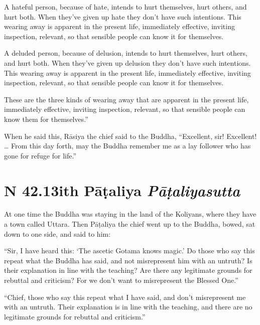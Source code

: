 \documentclass[12pt,openany]{book}%
\newcommand*{\suttatitleacronym}[1]{\smaller[2]{#1}\vspace*{.3em}}
\newcommand*{\suttatitletranslation}[1]{\linebreak{#1}}
\newcommand*{\suttatitleroot}[1]{\linebreak\smaller[2]\itshape{#1}}
\newcommand*{\tocacronym}[1]{\hspace*{-3.3em}{#1}\quad}
\newcommand*{\toctranslation}[1]{#1}
\newcommand*{\tocroot}[1]{(\textit{#1})}
\begin{document}
A hateful person, because of hate, intends to hurt themselves, hurt others, and hurt both. When they’ve given up hate they don’t have such intentions. This wearing away is apparent in the present life, immediately effective, inviting inspection, relevant, so that sensible people can know it for themselves. 

A deluded person, because of delusion, intends to hurt themselves, hurt others, and hurt both. When they’ve given up delusion they don’t have such intentions. This wearing away is apparent in the present life, immediately effective, inviting inspection, relevant, so that sensible people can know it for themselves. 

These are the three kinds of wearing away that are apparent in the present life, immediately effective, inviting inspection, relevant, so that sensible people can know them for themselves.” 

When he said this, \textsanskrit{Rāsiya} the chief said to the Buddha, “Excellent, sir! Excellent! … From this day forth, may the Buddha remember me as a lay follower who has gone for refuge for life.” 

%
\section*{{\suttatitleacronym SN 42.13}{\suttatitletranslation With Pāṭaliya }{\suttatitleroot Pāṭaliyasutta}}
\addcontentsline{toc}{section}{\tocacronym{SN 42.13} \toctranslation{With Pāṭaliya } \tocroot{Pāṭaliyasutta}}

At one time the Buddha was staying in the land of the Koliyans, where they have a town called Uttara. Then \textsanskrit{Pāṭaliya} the chief went up to the Buddha, bowed, sat down to one side, and said to him: 

“Sir, I have heard this: ‘The ascetic Gotama knows magic.’ Do those who say this repeat what the Buddha has said, and not misrepresent him with an untruth? Is their explanation in line with the teaching? Are there any legitimate grounds for rebuttal and criticism? For we don’t want to misrepresent the Blessed One.” 

“Chief, those who say this repeat what I have said, and don’t misrepresent me with an untruth. Their explanation is in line with the teaching, and there are no legitimate grounds for rebuttal and criticism.” 
\end{document}
